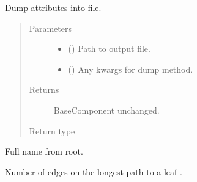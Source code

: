 \documentclass[letterpaper,10pt,english]{sphinxmanual}
\begin{document}
\begin{fulllineitems}
\begin{fulllineitems}
\label{\detokenize{api/wells:geology.src.wells.WellSegment.dump}}
Dump attributes into file.
\begin{quote}\begin{description}
\item[{Parameters}] \leavevmode\begin{itemize}
\item {} 
 () \textendash{} Path to output file.

\item {} 
 (\sphinxstyleliteralemphasis{\sphinxupquote{, }}) \textendash{} Any kwargs for dump method.

\end{itemize}

\item[{Returns}] \leavevmode
{} \textendash{} BaseComponent unchanged.

\item[{Return type}] \leavevmode
{\hyperref[\detokenize{api/base_classes:geology.src.base_component.BaseComponent}]{}}

\end{description}\end{quote}

\end{fulllineitems}


\begin{fulllineitems}
Full name from root.

\end{fulllineitems}


\begin{fulllineitems}
\label{\detokenize{api/wells:geology.src.wells.WellSegment.height}}
Number of edges on the longest path to a leaf .


\end{fulllineitems}
\end{fulllineitems}
\end{document}
